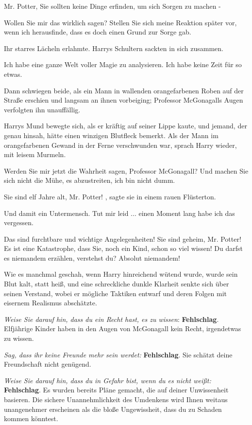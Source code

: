 \glqq Mr. Potter, Sie sollten keine Dinge erfinden, um sich Sorgen zu machen
-\grqq{}

\glqq Wollen Sie mir das wirklich sagen? Stellen Sie sich meine Reaktion später
vor, wenn ich herausfinde, dass es doch einen Grund zur Sorge gab.\grqq{}

Ihr starres Lächeln erlahmte. Harrys Schultern sackten in sich zusammen.

\glqq Ich habe eine ganze Welt voller Magie zu analysieren. Ich habe keine Zeit
für so etwas.\grqq{}

Dann schwiegen beide, als ein Mann in wallenden orangefarbenen Roben auf der
Straße erschien und langsam an ihnen vorbeiging; Professor McGonagalls Augen
verfolgten ihn unauffällig.

Harrys Mund bewegte sich, als er kräftig auf seiner Lippe kaute, und jemand, der
genau hinsah, hätte einen winzigen Blutfleck bemerkt. Als der Mann im
orangefarbenen Gewand in der Ferne verschwunden war, sprach Harry wieder,
mit leisem Murmeln.

\glqq Werden Sie mir jetzt die Wahrheit sagen, Professor McGonagall? Und machen
Sie sich nicht die Mühe, es abzustreiten, ich bin nicht dumm.\grqq{}

\glqq Sie sind elf Jahre alt, Mr. Potter!\grqq{} , sagte sie in einem rauen
Flüsterton.

\glqq Und damit ein Untermensch. Tut mir leid ... einen Moment lang habe ich das
vergessen.\grqq{}

\glqq Das sind furchtbare und wichtige Angelegenheiten! Sie sind geheim, Mr.
Potter! Es ist eine Katastrophe, dass Sie, noch ein Kind, schon so viel
wissen! Du darfst es niemandem erzählen, verstehst du? Absolut
niemandem!\grqq{}

Wie es manchmal geschah, wenn Harry hinreichend wütend wurde, wurde sein Blut
kalt, statt heiß, und eine schreckliche dunkle Klarheit senkte sich über
seinen Verstand, wobei er mögliche Taktiken entwarf und deren Folgen mit
eisernem Realismus abschätzte.

\emph{Weise Sie darauf hin, dass du ein Recht hast, es zu wissen}:
\textbf{Fehlschlag}. Elfjährige Kinder haben in den Augen von
McGonagall kein Recht, irgendetwas zu wissen.

\emph{Sag, dass ihr keine Freunde mehr sein werdet:}
\textbf{Fehlschlag}. Sie schätzt deine Freundschaft nicht genügend.

\emph{Weise Sie darauf hin, dass du in Gefahr bist, wenn du es nicht weißt:
}\textbf{Fehlschlag}. Es wurden bereits Pläne gemacht, die auf
deiner Unwissenheit basieren. Die sichere Unannehmlichkeit des Umdenkens
wird Ihnen weitaus unangenehmer erscheinen als die bloße Ungewissheit, dass
du zu Schaden kommen könntest.

